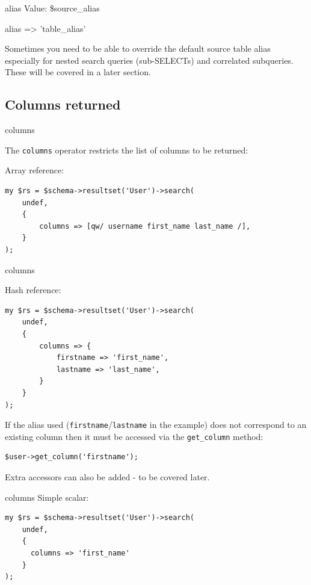 \begin{frame}[fragile]{alias}
Value: \$source\_alias

    alias => 'table\_alias'

\end{frame}

Sometimes you need to be able to override the default source table alias especially for nested search queries (sub-SELECTs) and correlated subqueries. These will be covered in a later section.

\subsection{Columns returned}
\begin{frame}[fragile]{columns}

The \verb|columns| operator restricts the list of columns to be returned:


Array reference:

\begin{lstlisting}
my $rs = $schema->resultset('User')->search(
    undef,
    {
        columns => [qw/ username first_name last_name /],
    }
);
\end{lstlisting}
\end{frame}

\begin{frame}[fragile]{columns}

Hash reference:

\begin{lstlisting}
my $rs = $schema->resultset('User')->search(
    undef,
    {
        columns => {
            firstname => 'first_name',
            lastname => 'last_name',
        }
    }
);
\end{lstlisting}
\end{frame}

If the alias used (\verb|firstname|/\verb|lastname| in the example) does not correspond to
an existing column then it must be accessed via the \verb|get_column| method:

\begin{lstlisting}
$user->get_column('firstname');
\end{lstlisting}

Extra accessors can also be added - to be covered later.


\begin{frame}[fragile]{columns}
Simple scalar:

\begin{lstlisting}
my $rs = $schema->resultset('User')->search(
    undef,
    {
      columns => 'first_name'
    }
);
\end{lstlisting}

\end{frame}

